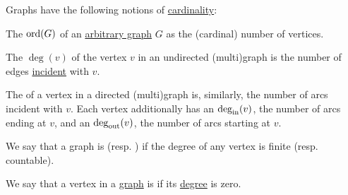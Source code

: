 \begin{definition}\label{def:graph_cardinality}
  Graphs have the following notions of \hyperref[thm:cardinality_existence]{cardinality}:
  \begin{thmenum}
     The  \( \operatorname{ord}(G) \) of an \hyperref[rem:arbitrary_graph]{arbitrary graph} \( G \) as the (cardinal) number of vertices.

    \medskip

     The  \( \deg(v) \) of the vertex \( v \) in an undirected (multi)graph is the number of edges \hyperref[def:graph_incidence]{incident} with \( v \).

     The  of a vertex in a directed (multi)graph is, similarly, the number of arcs incident with \( v \). Each vertex additionally has an  \( \deg_{\operatorname{in}}(v) \), the number of arcs ending at \( v \), and an  \( \deg_{\operatorname{out}}(v) \), the number of arcs starting at \( v \).

     We say that a graph is  (resp. ) if the degree of any vertex is finite (resp. countable).
  \end{thmenum}
\end{definition}

\begin{definition}\label{def:isolated_vertex}
  We say that a vertex in a \hyperref[rem:arbitrary_graph]{graph} is  if its \hyperref[def:graph_cardinality/directed_degree]{degree} is zero.
\end{definition}

